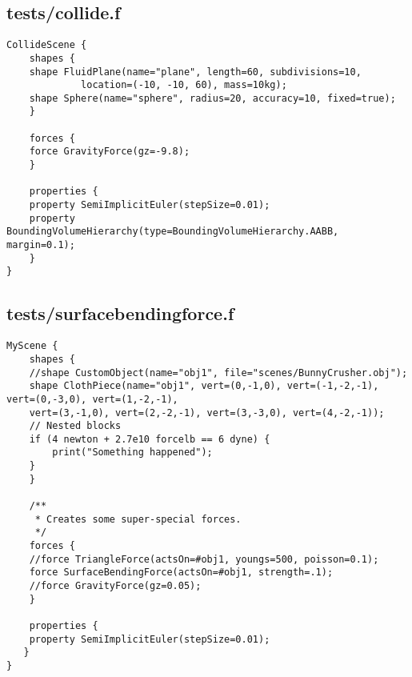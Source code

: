 \subsection*{tests/collide.f}
\begin{lstlisting}
CollideScene {
    shapes {
	shape FluidPlane(name="plane", length=60, subdivisions=10,
			 location=(-10, -10, 60), mass=10kg);
	shape Sphere(name="sphere", radius=20, accuracy=10, fixed=true);
    }

    forces {
	force GravityForce(gz=-9.8);
    }

    properties {
	property SemiImplicitEuler(stepSize=0.01);
	property BoundingVolumeHierarchy(type=BoundingVolumeHierarchy.AABB, margin=0.1);
    }
}
\end{lstlisting}

\subsection*{tests/surfacebendingforce.f}
\begin{lstlisting}
MyScene {
    shapes {
	//shape CustomObject(name="obj1", file="scenes/BunnyCrusher.obj");
	shape ClothPiece(name="obj1", vert=(0,-1,0), vert=(-1,-2,-1), vert=(0,-3,0), vert=(1,-2,-1), 
	vert=(3,-1,0), vert=(2,-2,-1), vert=(3,-3,0), vert=(4,-2,-1));
	// Nested blocks
	if (4 newton + 2.7e10 forcelb == 6 dyne) {
	    print("Something happened");
	}
    }

    /**
     * Creates some super-special forces.
     */
    forces {
	//force TriangleForce(actsOn=#obj1, youngs=500, poisson=0.1);
	force SurfaceBendingForce(actsOn=#obj1, strength=.1);
	//force GravityForce(gz=0.05);
    }

    properties { 
	property SemiImplicitEuler(stepSize=0.01);
   }
}
\end{lstlisting}

